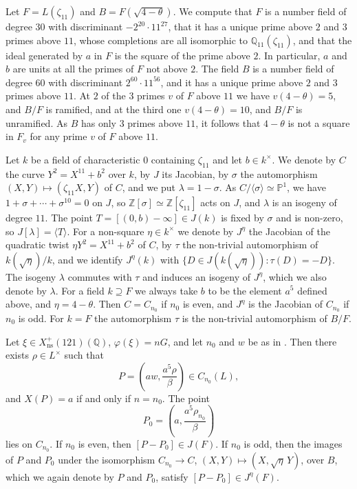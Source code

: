 \documentclass[11pt,reqno]{amsart}
\newcommand{\Q}{\mathbb{Q}}
\newcommand{\Z}{\mathbb{Z}}
\newcommand{\PP}{\mathbb{P}}
\newcommand{\ns}{\mathrm{ns}}
\newcommand{\Xns}[1]{X_{\ns}^+(#1)}
\theoremstyle{definition}
\numberwithin{equation}{section}
\begin{document}
Let $F=L(\zeta_{11})$ and $B=F(\sqrt{4-\theta})$. We compute that $F$ is a number field of degree $30$ with discriminant $-2^{20}\cdot 11^{27}$, that it has a unique prime above $2$ and $3$ primes above $11$, whose completions are all isomorphic to $\Q_{11}(\zeta_{11})$, and that the ideal generated by $a$ in $F$ is the square of the prime above $2$. In particular, $a$ and $b$ are units at all the primes of $F$ not above $2$. The field $B$ is a number field of degree $60$ with discriminant $2^{60}\cdot 11^{56}$, and it has a unique prime above $2$ and $3$ primes above $11$. At $2$ of the $3$ primes $v$ of $F$ above $11$ we have $v(4-\theta)=5$, and $B/F$ is ramified, and at the third one $v(4-\theta)=10$, and $B/F$ is unramified. As $B$ has only $3$ primes above $11$, it follows that $4-\theta$ is not a square in $F_v$ for any prime $v$ of $F$ above $11$.

Let $k$ be a field of characteristic $0$ containing $\zeta_{11}$ and let $b\in k^\times$. We denote by $C$ the curve $Y^2=X^{11}+b^2$ over $k$, by $J$ its Jacobian, by $\sigma$ the automorphism $(X,Y)\mapsto(\zeta_{11}X,Y)$ of $C$, and we put $\lambda=1-\sigma$. As $C/\langle\sigma\rangle\simeq\PP^1$, we have $1+\sigma+\cdots+\sigma^{10}=0$ on $J$, so $\Z[\sigma]\simeq \Z[\zeta_{11}]$ acts on $J$, and $\lambda$ is an isogeny of degree $11$. The point $T=[(0,b)-\infty]\in J(k)$ is fixed by $\sigma$ and is non-zero, so $J[\lambda]=\langle T\rangle$. For a non-square $\eta\in k^\times$ we denote by $J^\eta$ the Jacobian of the quadratic twist $\eta Y^2=X^{11}+b^2$ of $C$, by $\tau$ the non-trivial automorphism of $k(\sqrt\eta)/k$, and we identify $J^\eta(k)$ with $\{D\in J(k(\sqrt\eta)): \tau(D)=-D\}$. The isogeny $\lambda$ commutes with $\tau$ and induces an isogeny of $J^\eta$, which we also denote by $\lambda$. For a field $k\supseteq F$ we always take $b$ to be the element $a^5$ defined above, and $\eta=4-\theta$. Then $C=C_{n_0}$ if $n_0$ is even, and $J^\eta$ is the Jacobian of $C_{n_0}$ if $n_0$ is odd. For $k=F$ the automorphism $\tau$ is the non-trivial automorphism of $B/F$.

\begin{proposition}\label{prop:genus5}
Let $\xi\in \Xns{121}(\Q)$, $\varphi(\xi)=nG$, and let $n_0$ and $w$ be as in . Then there exists $\rho\in L^\times$ such that
$$P=\left(aw,\frac{a^5\rho}{\beta}\right)\in C_{n_0}(L),$$
and $X(P)=a$ if and only if $n=n_0$. The point
$$P_0=\left(a,\frac{a^5\rho_{n_0}}{\beta}\right)$$
lies on $C_{n_0}$. If $n_0$ is even, then $[P-P_0]\in J(F)$. If $n_0$ is odd, then the images of $P$ and $P_0$ under the isomorphism $C_{n_0}\rightarrow C$, $(X,Y)\mapsto(X,\sqrt\eta\, Y)$, over $B$, which we again denote by $P$ and $P_0$, satisfy $[P-P_0]\in J^\eta(F)$.
\end{proposition}
\end{document}
